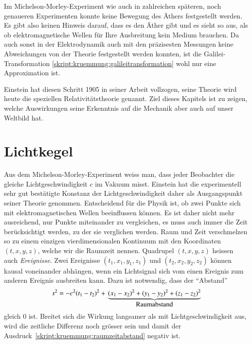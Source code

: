 Im Michelson-Morley-Experiment wie auch in zahlreichen späteren, noch
genaueren Experimenten konnte keine Bewegung des Äthers festgestellt
werden.
Es gibt also keinen Hinweis darauf, dass es den Äther gibt und es
sieht so aus, als ob elektromagnetische Wellen für Ihre Ausbreitung
kein Medium brauchen.
Da auch sonst in der Elektrodynamik auch mit den präzisesten Messungen
keine Abweichungen von der Theorie festgestellt werden konnten,
ist die Galilei-Transformation
\eqref{skript:kruemmung:galileitransformation} wohl nur eine
Approximation ist.

Einstein hat diesen Schritt 1905 in seiner Arbeit \cite{skript:einstein}
vollzogen, seine Theorie wird heute die speziellen Relativitätstheorie genannt.
Ziel dieses Kapitels ist zu zeigen, welche Auswirkungen seine
Erkenntnis auf die Mechanik aber auch auf unser Weltbild hat.
%
%

\section{Lichtkegel%
\label{skript:speziell:section:lichtkegel}}
Aus dem Michelson-Morley-Experiment weiss man, dass jeder Beobachter
die gleiche Lichtgeschwindigkeit $c$ im Vakuum misst.
Einstein hat die experimentell sehr gut bestätigte Konstanz der
Lichtgeschwindigkeit daher als Ausgangspunkt seiner Theorie genommen.
Entscheidend für die Physik ist, ob zwei Punkte sich mit elektromagnetischen
Wellen beeinflussen können.
Es ist daher nicht mehr ausreichend, nur Punkte miteinander zu vergleichen,
es muss auch immer die Zeit berücksichtigt werden, zu der sie verglichen
werden.
Raum und Zeit verschmelzen so zu einem einzigen vierdimensionalen
Kontinuum mit den Koordinaten $(t,x,y,z)$, welche wir die Raumzeit
nennen.
%
Quadrupel $(t,x,y,z)$ heissen auch {\em Ereignisse}.
%
Zwei Ereignisse $(t_1,x_1,y_1,z_1)$ und $(t_2,x_2,y_2,z_2)$ können
kausal voneinander abhängen, wenn ein Lichtsignal sich vom einen Ereignis
zum anderen Ereignis ausbreiten kann.
Dazu ist notwendig, dass der ``Abstand''
\begin{equation}
s^2
=
-c^2(t_1-t_2)^2
+
\mathstrut
\underbrace{
(x_1-x_2)^2
+
(y_1-y_2)^2
+
(z_1-z_2)^2}_{\displaystyle\text{Raumabstand}}
\label{skript:kruemmung:raumzeitabstand}
\end{equation}
gleich $0$ ist.
Breitet sich die Wirkung langsamer als mit Lichtgeschwindigkeit aus,
wird die zeitliche Differenz noch grösser sein und damit der
Ausdruck~\eqref{skript:kruemmung:raumzeitabstand} negativ ist.

